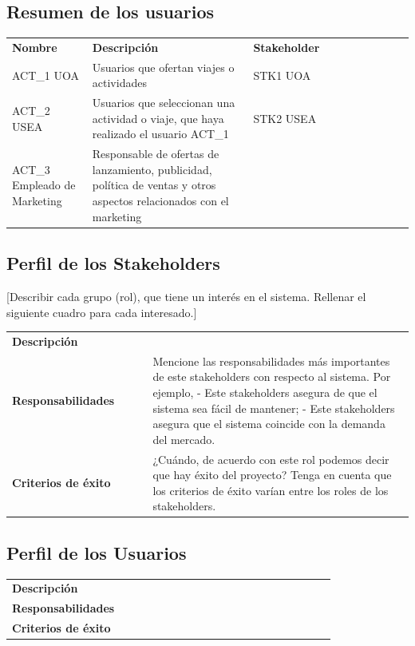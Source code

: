 \documentclass[11pt]{article}
\begin{document}
\subsection{Resumen de los usuarios}
\begin{table}[H]
  \centering
  \begin{tabular}{p{0.2\linewidth}p{0.4\linewidth}p{0.4\linewidth}}
    \toprule
    \textbf{Nombre} & \textbf{Descripción} & \textbf{Stakeholder} \\
    ACT\_1 UOA & Usuarios que ofertan viajes o actividades & STK1 UOA\\
    ACT\_2 USEA & Usuarios que seleccionan una actividad o viaje, que haya realizado el usuario ACT\_1 & STK2 USEA\\
    ACT\_3  Empleado de Marketing& Responsable de ofertas de lanzamiento, publicidad, política de ventas y otros aspectos relacionados con el marketing &\\
    \midrule
    \bottomrule
  \end{tabular}
\end{table}

\subsection{Perfil de los Stakeholders}
[Describir cada grupo (rol), que tiene un interés en el sistema. Rellenar el siguiente cuadro para cada interesado.]

\begin{table}[H]
  \centering
  \begin{tabular}{p{0.35\linewidth}|p{0.65\linewidth}}
    \toprule
    \textbf{Descripción} &\\
    \textbf{Responsabilidades} & Mencione las responsabilidades más importantes de este stakeholders con respecto al sistema. Por ejemplo,
- Este stakeholders asegura de que el sistema sea fácil de mantener;
- Este stakeholders asegura que el sistema coincide con la demanda del mercado. \\
    \textbf{Criterios de éxito} & ¿Cuándo, de acuerdo con este rol podemos decir que hay éxito del proyecto? Tenga en cuenta que los criterios de éxito varían entre los roles de los stakeholders. \\
    \bottomrule
  \end{tabular}
\end{table}

\subsection{Perfil de los Usuarios}
\begin{table}[H]
  \centering
  \begin{tabular}{p{0.35\linewidth}|p{0.65\linewidth}}
    \toprule
    \textbf{Descripción} &\\
    \textbf{Responsabilidades} &  \\
    \textbf{Criterios de éxito} &  \\
    \bottomrule
  \end{tabular}
\end{table}
\end{document}
